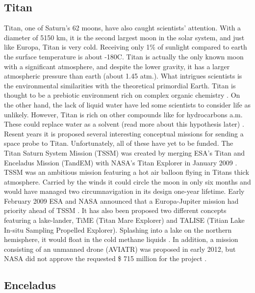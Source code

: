 \subsection*{Titan}
 
Titan, one of Saturn's 62 moons, have also caught scientists' attention.
With a diameter of 5150 km, it is the second largest moon in the solar system, and just like Europa, Titan is very cold.
Receiving only 1\% of sunlight compared to earth the surface temperature is about -180\degree C.
Titan is actually the only known moon with a significant atmosphere, and despite the lower gravity, it has a larger atmospheric pressure than earth (about 1.45 atm.).
What intrigues scientists is the environmental similarities with the theoretical primordial Earth.
Titan is thought to be a prebiotic environment rich on complex organic chemistry \cite{FPlan05}. On the other hand, the lack of liquid water have led some scientists to consider life as unlikely.
However, Titan is rich on other compounds like for hydrocarbons a.m.
These could replace water as a solvent (read more about this hypothesis later) \cite{FPlan06}.
Resent years it is proposed several interesting conceptual missions for sending a space probe to Titan. Unfortunately, all of these have yet to be funded.
The Titan Saturn System Mission (TSSM) was created by merging ESA’s Titan and Enceladus Mission (TandEM) with NASA’s Titan Explorer in January 2009 \cite{FPlan10}.
TSSM was an ambitious mission featuring a hot air balloon flying in Titans thick atmosphere.
Carried by the winds it could circle the moon in only six months and would have managed two circumnavigation in its design one-year lifetime.
Early February 2009 ESA and NASA announced that a Europa-Jupiter mission had priority ahead of TSSM \cite{FPlan07}.
It has also been proposed two different concepts featuring a lake-lander, TiME (Titan Mare Explorer) and TALISE (Titian Lake In-situ Sampling Propelled Explorer).
Splashing into a lake on the northern hemisphere, it would float in the cold methane liquids \cite{FPlan05}.
In addition, a mission consisting of an unmanned drone (AVIATR) was proposed in early 2012, but NASA did not approve the requested \$ 715 million for the project \cite{FPlan05}.

\subsection*{Enceladus}
 
